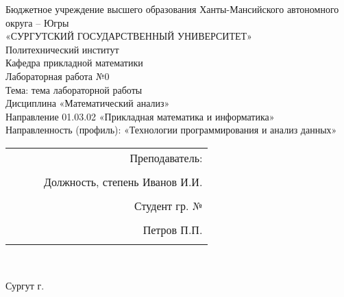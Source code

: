 \documentclass[a4paper]{article}
\begin{document}
\thispagestyle{empty}
\begin{center}

\large{Бюджетное учреждение высшего образования Ханты-Мансийского автономного округа – Югры}\\
\large{«СУРГУТСКИЙ ГОСУДАРСТВЕННЫЙ УНИВЕРСИТЕТ»}\\

\hfill \break
\normalsize{Политехнический институт}\\
 \hfill \break
\normalsize{Кафедра прикладной математики}\\
\hfill\break
\hfill \break
\hfill \break
\hfill \break
\large{Лабораторная работа №0}\\
\normalsize{Тема: тема лабораторной работы}\\
\hfill \break
\hfill \break
\hfill \break
\hfill \break
Дисциплина «Математический анализ»\\
\hfill \break
\small{Направление 01.03.02 «Прикладная математика и информатика»\\
Направленность (профиль): «Технологии программирования и анализ данных»}\\
\end{center}

\hfill \break
\hfill \break
\hfill \break
\hfill \break
\hfill \break
\hfill \break

\begin{flushright}
\normalsize{ 
\begin{tabular}{ccrr}
 & & & Преподаватель: \\\\
 & & & Должность, степень Иванов И.И. \\\\
 & & & Студент гр. № \\\\
 & & & Петров П.П. \\\\
\end{tabular}
}\\
\end{flushright}

\hfill \break
\hfill \break
\begin{center} Сургут \the\year{} г.  \end{center}
\end{document}
